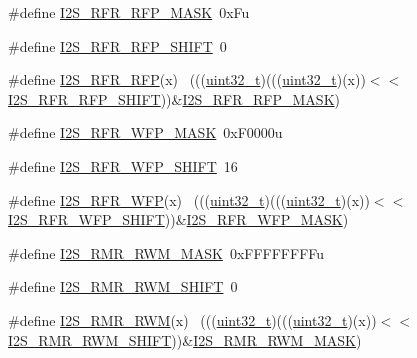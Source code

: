\begin{DoxyCompactItemize}
\item 
\#define \hyperlink{group___i2_s___register___masks_ga47151099035d8d850a3fb194cdb35bb2}{I2\+S\+\_\+\+R\+F\+R\+\_\+\+R\+F\+P\+\_\+\+M\+A\+SK}~0x\+Fu
\item 
\#define \hyperlink{group___i2_s___register___masks_ga7ffec4d33d58891c8388e1e85b206f58}{I2\+S\+\_\+\+R\+F\+R\+\_\+\+R\+F\+P\+\_\+\+S\+H\+I\+FT}~0
\item 
\#define \hyperlink{group___i2_s___register___masks_ga12c385c4e121236e4b2e9c2c744ef406}{I2\+S\+\_\+\+R\+F\+R\+\_\+\+R\+FP}(x)                                                  ~(((\hyperlink{_p_e___types_8h_a33594304e786b158f3fb30289278f5af}{uint32\+\_\+t})(((\hyperlink{_p_e___types_8h_a33594304e786b158f3fb30289278f5af}{uint32\+\_\+t})(x))$<$$<$\hyperlink{group___i2_s___register___masks_ga7ffec4d33d58891c8388e1e85b206f58}{I2\+S\+\_\+\+R\+F\+R\+\_\+\+R\+F\+P\+\_\+\+S\+H\+I\+FT}))\&\hyperlink{group___i2_s___register___masks_ga47151099035d8d850a3fb194cdb35bb2}{I2\+S\+\_\+\+R\+F\+R\+\_\+\+R\+F\+P\+\_\+\+M\+A\+SK})
\item 
\#define \hyperlink{group___i2_s___register___masks_ga14ca8fb387a14c562c2721c054f25acc}{I2\+S\+\_\+\+R\+F\+R\+\_\+\+W\+F\+P\+\_\+\+M\+A\+SK}~0x\+F0000u
\item 
\#define \hyperlink{group___i2_s___register___masks_ga1890bc961298234e8516b19b4523bfb5}{I2\+S\+\_\+\+R\+F\+R\+\_\+\+W\+F\+P\+\_\+\+S\+H\+I\+FT}~16
\item 
\#define \hyperlink{group___i2_s___register___masks_gaeea13d7abeeb75eda8456fd9f33d918a}{I2\+S\+\_\+\+R\+F\+R\+\_\+\+W\+FP}(x)                                                  ~(((\hyperlink{_p_e___types_8h_a33594304e786b158f3fb30289278f5af}{uint32\+\_\+t})(((\hyperlink{_p_e___types_8h_a33594304e786b158f3fb30289278f5af}{uint32\+\_\+t})(x))$<$$<$\hyperlink{group___i2_s___register___masks_ga1890bc961298234e8516b19b4523bfb5}{I2\+S\+\_\+\+R\+F\+R\+\_\+\+W\+F\+P\+\_\+\+S\+H\+I\+FT}))\&\hyperlink{group___i2_s___register___masks_ga14ca8fb387a14c562c2721c054f25acc}{I2\+S\+\_\+\+R\+F\+R\+\_\+\+W\+F\+P\+\_\+\+M\+A\+SK})
\item 
\#define \hyperlink{group___i2_s___register___masks_ga72f2c1e6c8be00aa0227c8d924c3506a}{I2\+S\+\_\+\+R\+M\+R\+\_\+\+R\+W\+M\+\_\+\+M\+A\+SK}~0x\+F\+F\+F\+F\+F\+F\+F\+Fu
\item 
\#define \hyperlink{group___i2_s___register___masks_gaf69010ae59c583206d59a8cc0c681c04}{I2\+S\+\_\+\+R\+M\+R\+\_\+\+R\+W\+M\+\_\+\+S\+H\+I\+FT}~0
\item 
\#define \hyperlink{group___i2_s___register___masks_ga7ba1c2c5eed2f45b4ffd6dc887628801}{I2\+S\+\_\+\+R\+M\+R\+\_\+\+R\+WM}(x)                                                  ~(((\hyperlink{_p_e___types_8h_a33594304e786b158f3fb30289278f5af}{uint32\+\_\+t})(((\hyperlink{_p_e___types_8h_a33594304e786b158f3fb30289278f5af}{uint32\+\_\+t})(x))$<$$<$\hyperlink{group___i2_s___register___masks_gaf69010ae59c583206d59a8cc0c681c04}{I2\+S\+\_\+\+R\+M\+R\+\_\+\+R\+W\+M\+\_\+\+S\+H\+I\+FT}))\&\hyperlink{group___i2_s___register___masks_ga72f2c1e6c8be00aa0227c8d924c3506a}{I2\+S\+\_\+\+R\+M\+R\+\_\+\+R\+W\+M\+\_\+\+M\+A\+SK})
$$
\end{DoxyCompactItemize}
